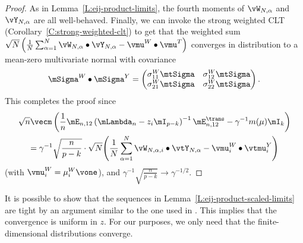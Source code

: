 \begin{proof}
    As in Lemma~\ref{L:eij-product-limits}, the fourth moments of
    $\vW_{N,\alpha}$ and $\vY_{N,\alpha}$ are all well-behaved.  Finally,
    we can invoke the strong weighted CLT 
    (Corollary~\ref{C:strong-weighted-clt}) to get that the weighted sum
    \(
        \sqrt{N} \left(
            \frac{1}{N}
            \sum_{\alpha=1}^N
                \vW_{N,\alpha} \bullet \vY_{N,\alpha}
            -
                \vmu^W \bullet \vmu^T
        \right)
    \)
    converges in distribution to a mean-zero multivariate normal with
    covariance
    \[
        \mSigma^W \bullet \mSigma^Y
            =
                \left(
                \begin{matrix}
                    \sigma^W_{11} \mtSigma &
                        \sigma^W_{12} \mtSigma \\
                    \sigma^W_{21} \mtSigma &
                        \sigma^W_{22} \mtSigma 
                \end{matrix}
                \right).
    \]
    This completes the proof since
    \begin{multline*}
        \sqrt{n}
        \vecm \left(
            \frac{1}{n}
            \mE_{n,12}
            \left(
                \mLambda_n
                -
                z_i
                \mI_{p-k}
            \right)^{-1}
            \mE_{n,12}^\trans
            -
            \gamma^{-1}
            m( \mu )
            \mI_k
        \right) \\
            =
                \gamma^{-1}
                \sqrt{ \frac{n}{p-k} }
                \cdot
                \sqrt{ N }
                \Bigg( 
                    \frac{1}{N}
                    \sum_{\alpha=1}^N
                        \vW_{N,\alpha,i} \bullet \vtY_{N,\alpha}
                    -
                        \vmu_i^W \bullet \vtmu_i^Y
                \Bigg)
    \end{multline*}
    (with $\vmu_i^W = \mu_i^W \vone$),
    and
    \(
        \gamma^{-1}
        \sqrt{ \frac{n}{p-k} }
        \to
        \gamma^{-1/2}.
    \)
\end{proof}

\begin{remark}
    It is possible to show that the sequences in Lemma~\ref{L:eij-product-scaled-limits} are tight by an argument similar to the one used in \cite{onatski2009}.  This implies that the convergence is uniform in $z$.  For our purposes, we only need that the finite-dimensional distributions converge.
\end{remark}

